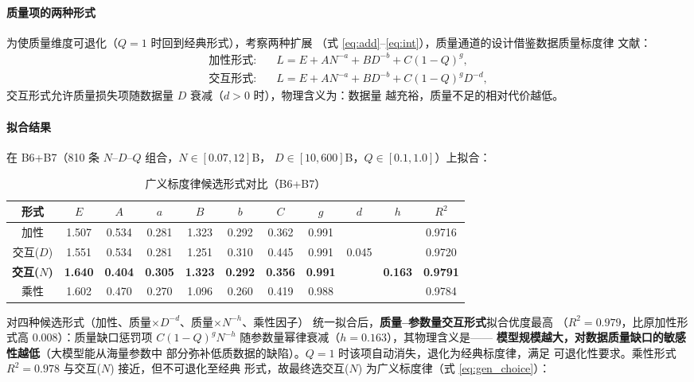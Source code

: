 \paragraph{质量项的两种形式}

为使质量维度可退化（$Q=1$ 时回到经典形式），考察两种扩展
（式 \ref{eq:add}--\ref{eq:int}），质量通道的设计借鉴数据质量标度律
文献\cite{refSardana}：
\begin{align}
\text{加性形式:}\quad & L=E+A N^{-a}+B D^{-b}+C(1-Q)^{g},
\label{eq:add}\\
\text{交互形式:}\quad & L=E+A N^{-a}+B D^{-b}+C(1-Q)^{g}D^{-d},
\label{eq:int}
\end{align}
交互形式允许质量损失项随数据量 $D$ 衰减（$d>0$ 时），物理含义为：数据量
越充裕，质量不足的相对代价越低。

\paragraph{拟合结果}

在 B6+B7（810 条 $N$--$D$--$Q$ 组合，$N\in[0.07,12]$B，
$D\in[10,600]$B，$Q\in[0.1,1.0]$）上拟合：

\begin{table}[htbp]
\centering
\caption{广义标度律候选形式对比（B6+B7）}
\label{tab:p2_forms}
\begin{tabular}{c|cccccccccc}
\toprule
形式 & $E$ & $A$ & $a$ & $B$ & $b$ & $C$ & $g$ & $d$ & $h$ & $R^2$ \\
\midrule
加性 & 1.507 & 0.534 & 0.281 & 1.323 & 0.292 & 0.362 & 0.991 & & & 0.9716 \\
交互($D$) & 1.551 & 0.534 & 0.281 & 1.251 & 0.310 & 0.445 & 0.991 & 0.045 & & 0.9720 \\
\textbf{交互($N$)} & \textbf{1.640} & \textbf{0.404} & \textbf{0.305} & \textbf{1.323} & \textbf{0.292} & \textbf{0.356} & \textbf{0.991} & & \textbf{0.163} & \textbf{0.9791} \\
乘性 & 1.602 & 0.470 & 0.270 & 1.096 & 0.260 & 0.419 & 0.988 & & & 0.9784 \\
\bottomrule
\end{tabular}
\end{table}

对四种候选形式（加性、质量$\times D^{-d}$、质量$\times N^{-h}$、乘性因子）
统一拟合后，\textbf{质量--参数量交互形式}拟合优度最高
（$R^2=0.979$，比原加性形式高 0.008）：质量缺口惩罚项
$C(1-Q)^{g}N^{-h}$ 随参数量幂律衰减（$h=0.163$），其物理含义是——
\textbf{模型规模越大，对数据质量缺口的敏感性越低}（大模型能从海量参数中
部分弥补低质数据的缺陷）。$Q=1$ 时该项自动消失，退化为经典标度律，满足
可退化性要求。乘性形式 $R^2=0.978$ 与交互($N$) 接近，但不可退化至经典
形式，故最终选交互($N$) 为广义标度律（式 \ref{eq:gen_choice}）：

